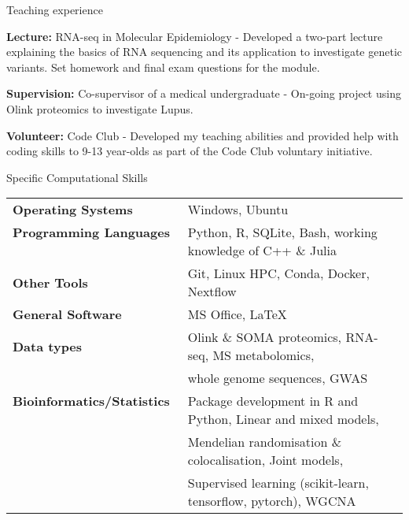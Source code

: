 \documentclass{resume}
\begin{document}
\begin{rSection}{Teaching experience}

\item \textbf{Lecture:} RNA-seq in Molecular Epidemiology - Developed a two-part lecture explaining the basics of RNA sequencing and its application to investigate genetic variants. Set homework and final exam questions for the module.
\vspace{2pt plus 1pt minus 1pt}

\item \textbf{Supervision:} Co-supervisor of a medical undergraduate - On-going project using Olink proteomics to investigate Lupus.

\vspace{2pt plus 1pt minus 1pt}

\item \textbf{Volunteer:} Code Club - Developed my teaching abilities and provided help with coding skills to 9-13 year-olds as part of the Code Club voluntary initiative.
\vspace{2pt plus 1pt minus 1pt}

\end{rSection}
\begin{rSection}{Specific Computational Skills}

\begin{tabular}{ @{} >{\bfseries}l @{\hspace{3ex}} l }
Operating Systems \ & Windows, Ubuntu \vspace{2pt plus 1pt minus 1pt} \\
Programming Languages \ & Python, R, SQLite, Bash, working knowledge of C++ \& Julia \vspace{2pt plus 1pt minus 1pt} \\
Other Tools \ & Git, Linux HPC, Conda, Docker, Nextflow \vspace{2pt plus 1pt minus 1pt}\\
General Software \ & MS Office, \LaTeX  \vspace{2pt plus 1pt minus 1pt} \\
Data types \ & Olink \& SOMA proteomics, RNA-seq, MS metabolomics, \\
    \ & whole genome sequences, GWAS \vspace{2pt plus 1pt minus 1pt} \\ 
Bioinformatics/Statistics \ & Package development in R and Python, Linear and mixed models, \\
    \ & Mendelian randomisation \& colocalisation, Joint models, \\
    \ & Supervised learning (scikit-learn, tensorflow, pytorch), WGCNA \\
\end{tabular}


\end{rSection}
\end{document}
